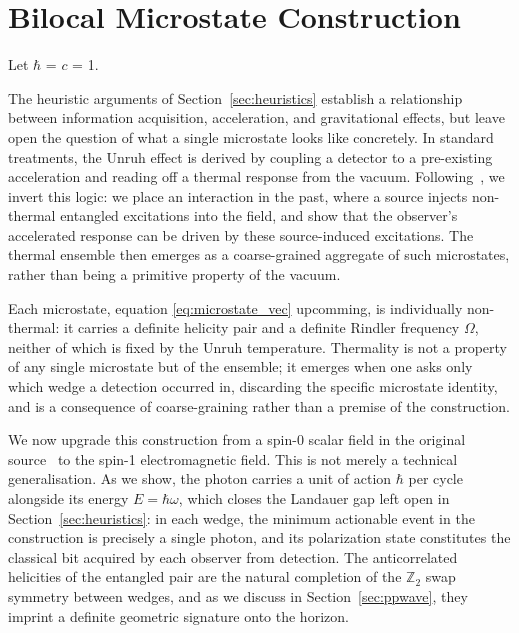 \documentclass[12pt,a4paper]{article}
\begin{document}
\section{Bilocal Microstate Construction}
\label{sec:microstates}

Let $\hbar$ = $c$ = 1.

The heuristic arguments of Section~\ref{sec:heuristics} establish a relationship between information acquisition, acceleration, and gravitational effects, but leave open the question of what a single microstate looks like concretely. In standard treatments, the Unruh effect is derived by coupling a detector to a pre-existing acceleration and reading off a thermal response from the vacuum. Following~\cite{player2025driving}, we invert this logic: we place an interaction in the past, where a source injects non-thermal entangled excitations into the field, and show that the observer's accelerated response can be driven by these source-induced excitations. The thermal ensemble then emerges as a coarse-grained aggregate of such microstates, rather than being a primitive property of the vacuum.

Each microstate, equation \eqref{eq:microstate_vec} upcomming, is individually 
non-thermal: it carries a definite helicity pair and a definite 
Rindler frequency $\Omega$, neither of which is fixed by the 
Unruh temperature. Thermality is not a property of any single 
microstate but of the ensemble; it emerges when one asks only 
which wedge a detection occurred in, discarding the specific 
microstate identity, and is a consequence of coarse-graining 
rather than a premise of the construction.

We now upgrade this construction from a spin-0 scalar field in the original source~\cite{player2025driving} to the spin-1 electromagnetic
field. This is not merely a technical generalisation. As we show, the photon carries a unit
of action $\hbar$ per cycle alongside its energy $E = \hbar\omega$, which closes the
Landauer gap left open in Section~\ref{sec:heuristics}: in each wedge, the minimum actionable event in the
construction is precisely a single photon, and its polarization state constitutes the
classical bit acquired by each observer from detection. The anticorrelated helicities of the entangled pair
are the natural completion of the $\mathbb{Z}_2$ swap symmetry between wedges, and as we
discuss in Section~\ref{sec:ppwave}, they imprint a definite geometric signature onto the
horizon.

\end{document}
